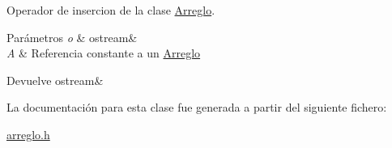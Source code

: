 Operador de insercion de la clase \hyperlink{class_arreglo}{Arreglo}. 


\begin{DoxyParams}{Parámetros}
{\em o} & ostream\& \\
\hline
{\em A} & Referencia constante a un \hyperlink{class_arreglo}{Arreglo} \\
\hline
\end{DoxyParams}
\begin{DoxyReturn}{Devuelve}
ostream\& 
\end{DoxyReturn}


La documentación para esta clase fue generada a partir del siguiente fichero\+:\begin{DoxyCompactItemize}
\item 
\hyperlink{arreglo_8h}{arreglo.\+h}\end{DoxyCompactItemize}
